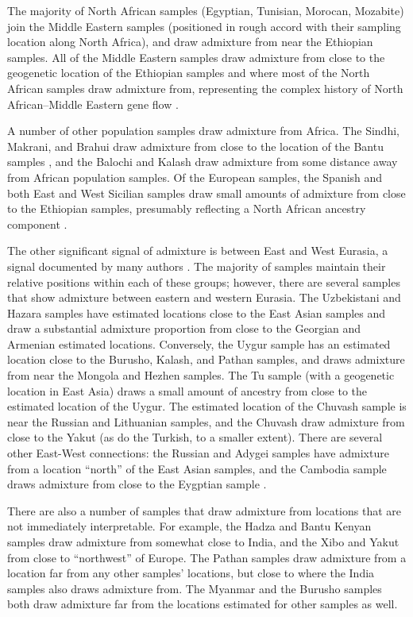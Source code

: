 \documentclass[10pt,letterpaper]{article}
\begin{document}
The majority of North African samples (Egyptian, Tunisian, Morocan, Mozabite) join the Middle Eastern samples (positioned in rough accord with their sampling location along North Africa), and draw admixture from near the Ethiopian samples. All of the Middle Eastern samples draw admixture from close to the geogenetic location of the Ethiopian samples and where most of the North African samples draw admixture from, representing the complex history of North African--Middle Eastern gene flow \cite{henn_genomic_2012,Hellenthal}. 

A number of other population samples draw admixture from Africa. The Sindhi, Makrani, and Brahui draw admixture from close to the location of the Bantu samples  \cite{Hellenthal}, and the Balochi and Kalash draw admixture from some distance away from African population samples.  Of the European samples, the Spanish and both East and West Sicilian samples draw small amounts of admixture from close to the Ethiopian samples, presumably reflecting a North African ancestry component  \cite{moorjani_history_2011,botigue_gene_2013}. 

The other significant signal of admixture is between East and West Eurasia, a signal documented by many authors \cite{rosenberg_genetic_2002,li_worldwide_2008, xu_genome-wide_2008,Hellenthal}. The majority of samples maintain their relative positions within each of these groups; however, there are several samples that show admixture between eastern and western Eurasia.  The Uzbekistani and Hazara samples have estimated locations close to the East Asian samples and draw a substantial admixture proportion from close to the Georgian and Armenian estimated locations.  Conversely, the Uygur sample has an estimated location close to the Burusho, Kalash, and Pathan samples, and draws admixture from near the Mongola and Hezhen samples. The Tu sample (with a geogenetic location in East Asia) draws a small amount of ancestry from close to the estimated location of the Uygur. The estimated location of the Chuvash sample is near the Russian and Lithuanian samples, and the Chuvash draw admixture from close to the Yakut (as do the Turkish, to a smaller extent). There are several other East-West connections: the Russian and Adygei samples have admixture from a location ``north'' of the East Asian samples, and the Cambodia sample draws admixture from close to the Eygptian sample \cite{Treemix, Hellenthal}. 

There are also a number of samples that draw admixture from locations that are not immediately interpretable.  
For example, the Hadza and Bantu Kenyan samples draw admixture from somewhat close to India, 
and the Xibo and Yakut from close to ``northwest'' of Europe.  
The Pathan samples draw admixture from a location far from any other samples' locations, 
but close to where the India samples also draws admixture from. 
The Myanmar and the Burusho samples both draw admixture far from the locations estimated for other samples as well.
\end{document}
